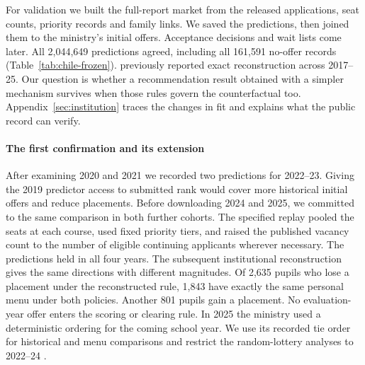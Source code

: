 For validation we built the full-report market from the released applications, seat counts, priority records and family links. We saved the predictions, then joined them to the ministry's initial offers. Acceptance decisions and wait lists come later. All 2,044,649 predictions agreed, including all 161,591 no-offer records (Table~\ref{tab:chile-frozen}). \citet[Appendix S7]{doganreserves} previously reported exact reconstruction across 2017--25. Our question is whether a recommendation result obtained with a simpler mechanism survives when those rules govern the counterfactual too. Appendix~\ref{sec:institution} traces the changes in fit and explains what the public record can verify.

\paragraph{The first confirmation and its extension}
After examining 2020 and 2021 we recorded two predictions for 2022--23. Giving the 2019 predictor access to submitted rank would cover more historical initial offers and reduce placements. Before downloading 2024 and 2025, we committed to the same comparison in both further cohorts. The specified replay pooled the seats at each course, used fixed priority tiers, and raised the published vacancy count to the number of eligible continuing applicants wherever necessary. The predictions held in all four years. The subsequent institutional reconstruction gives the same directions with different magnitudes. Of 2,635 pupils who lose a placement under the reconstructed rule, 1,843 have exactly the same personal menu under both policies. Another 801 pupils gain a placement. No evaluation-year offer enters the scoring or clearing rule. In 2025 the ministry used a deterministic ordering for the coming school year. We use its recorded tie order for historical and menu comparisons and restrict the random-lottery analyses to 2022--24 \citep{newtie,saedata}.

